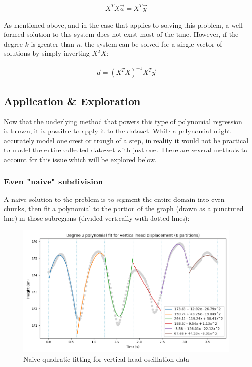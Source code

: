 \documentclass[12pt, a4paper]{article}
\begin{document}
\begin{align*}
    X^TX\vec{a}=X^T\vec{y}
\end{align*}

As mentioned above, and in the case that applies to solving this problem, a
well-formed solution to this system does not exist most of the time. However, if
the degree $k$ is greater than $n$, the system can be solved for a single vector
of solutions by simply inverting $X^TX$:

\begin{align*}
    \vec{a}=(X^TX)^{-1}X^T\vec{y}
\end{align*}

\subsection{Application \& Exploration}
Now that the underlying method that powers this type of polynomial regression is
known, it is possible to apply it to the dataset. While a polynomial might
accurately model one crest or trough of a step, in reality it would not be
practical to model the entire collected data-set with just one. There are
several methods to account for this issue which will be explored below. \\

\subsubsection{Even "naive" subdivision}
\label{section_naive_seg}
A naive solution to the problem is to segment the entire domain into even
chunks, then fit a polynomial to the portion of the graph (drawn as a punctured
line) in those subregions (divided vertically with dotted lines):

\begin{figure}[H]
    \centering
    \includegraphics[width=12cm]{p_naive_head_2.png}
    \caption{Naive quadratic fitting for vertical head oscillation data}
    \label{naive_head}
\end{figure}
\end{document}
